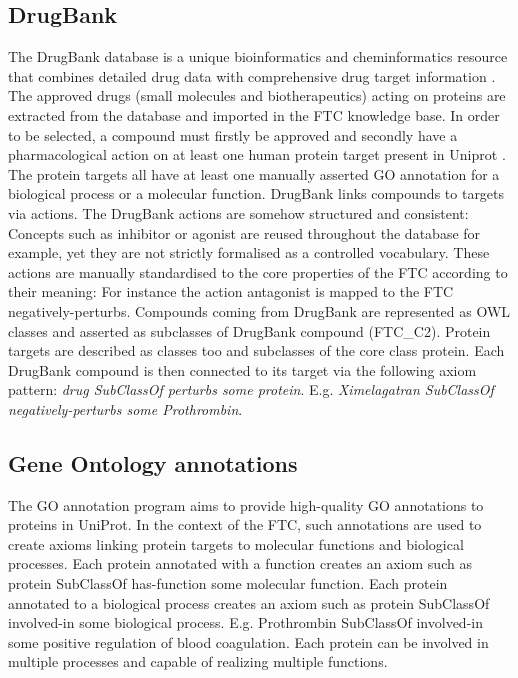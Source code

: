 \documentclass{bioinfo}
\begin{document}
\subsection{DrugBank}
The DrugBank database is a unique bioinformatics and cheminformatics resource 
that combines detailed drug data with comprehensive drug target information \citep{Knox2011}. The approved 
drugs (small molecules and biotherapeutics) acting on proteins are extracted from the database and 
imported in the FTC knowledge base. In order to be selected, a compound must firstly be approved and 
secondly have a pharmacological action on at least one human protein target present in Uniprot \citep{TheUniprotConsortium2013}. 
The protein targets all have at least one manually asserted GO annotation \citep{Dimmer2012} for a biological process or a 
molecular function. DrugBank links compounds to targets via actions. The DrugBank actions are somehow 
structured and consistent: Concepts such as inhibitor or agonist are reused throughout the database for 
example, yet they are not strictly formalised as a controlled vocabulary. These actions are manually 
standardised to the core properties of the FTC according to their meaning: For instance the action 
antagonist is mapped to the FTC negatively-perturbs.
Compounds coming from DrugBank are represented as OWL classes and asserted 
as subclasses of DrugBank compound (FTC\_C2). Protein targets are described as classes 
too and subclasses of the core class protein. Each DrugBank compound is then connected to 
its target via the following axiom pattern: \emph{drug SubClassOf perturbs some protein}. 
E.g. \emph{Ximelagatran SubClassOf negatively-perturbs some Prothrombin}.

\subsection{Gene Ontology annotations}
The GO annotation program aims to provide high-quality GO annotations to 
proteins in UniProt. In the context of the FTC, such annotations are used 
to create axioms linking protein targets to molecular functions and biological processes. 
Each protein annotated with a function creates an axiom such 
as protein SubClassOf has-function some molecular function. 
Each protein annotated to a biological process creates an axiom such 
as protein SubClassOf involved-in some biological process. 
E.g. Prothrombin SubClassOf involved-in some positive regulation of blood coagulation. 
Each protein can be involved in multiple processes and capable of realizing multiple functions.
\end{document}
